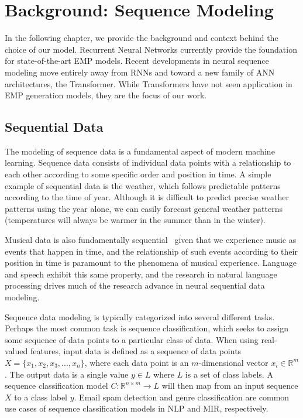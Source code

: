 \chapter{Background: Sequence Modeling}\label{ch:ch3}
In the following chapter, we provide the background and context behind the choice of our model. Recurrent Neural Networks currently provide the foundation for state-of-the-art EMP models. Recent developments in neural sequence modeling move entirely away from RNNs and toward a new family of ANN architectures, the Transformer. While Transformers have not seen application in EMP generation models, they are the focus of our work. 

\section{Sequential Data}\label{sec:sequential-data}
The modeling of sequence data is a fundamental aspect of modern machine learning. Sequence data consists of individual data points with a relationship to each other according to some specific order and position in time. A simple example of sequential data is the weather, which follows predictable patterns according to the time of year. Although it is difficult to predict precise weather patterns using the year alone, we can easily forecast general weather patterns (temperatures will always be warmer in the summer than in the winter). 

Musical data is also fundamentally sequential~\cite{widmer2016getting} given that we experience music as events that happen in time, and the relationship of such events according to their position in time is paramount to the phenomena of musical experience. Language and speech exhibit this same property, and the research in natural language processing drives much of the research advance in neural sequential data modeling. 

Sequence data modeling is typically categorized into several different tasks. Perhaps the most common task is sequence classification, which seeks to assign some sequence of data points to a particular class of data. When using real-valued features, input data is defined as a sequence of data points $X = \{x_1, x_2, x_3, ..., x_n\}$, where each data point is an $m$-dimensional vector $x_i \in \mathbb{R}^m$. The output data is a single value $y \in L$ where $L$ is a set of class labels. A sequence classification model $C: \mathbb{R}^{n \times m} \rightarrow L$ will then map from an input sequence $X$ to a class label $y$. Email spam detection and genre classification are common use cases of sequence classification models in NLP and MIR, respectively. 

